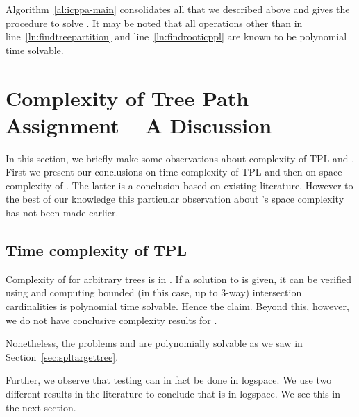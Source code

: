 Algorithm~\ref{al:icppa-main} consolidates all that we described above
and gives the procedure to solve \CFTPL. It may be noted that all operations other than in
line~\ref{ln:findtreepartition} and line~\ref{ln:findrooticppl} are
known to be polynomial time solvable.

\clearpage %

\section[Complexity]{Complexity of Tree Path Assignment -- A Discussion}
\label{sec:tplcomplexity}

In this section, we briefly make some observations about complexity of
TPL and \COP. First we present our conclusions on time complexity of
TPL and then on space complexity of \COP. The latter is a conclusion
based on existing literature. However to the best of our knowledge
this particular observation about \COP's space complexity has not been
made earlier.

\subsection{Time complexity of TPL}
\label{sec:tpltime}
Complexity of \CFTPL for arbitrary trees is in \np. If a solution to
\CFTPL is given, it can be verified using \ICPPL and computing bounded
(in this case, up to 3-way) intersection cardinalities is polynomial
time solvable. Hence the claim. Beyond this, however, we do not have
conclusive complexity results for \CFTPL. 

Nonetheless, the problems \CFTPLINT and \CFTPLKTREE are polynomially
solvable as we saw in Section~\ref{sec:spltargettree}.

Further, we observe that \COP testing can in fact be done in
logspace. We use two different results in the literature \cite{kklv10,
  mcc04} to conclude that \COP is in logspace. We see this in the next
section.


